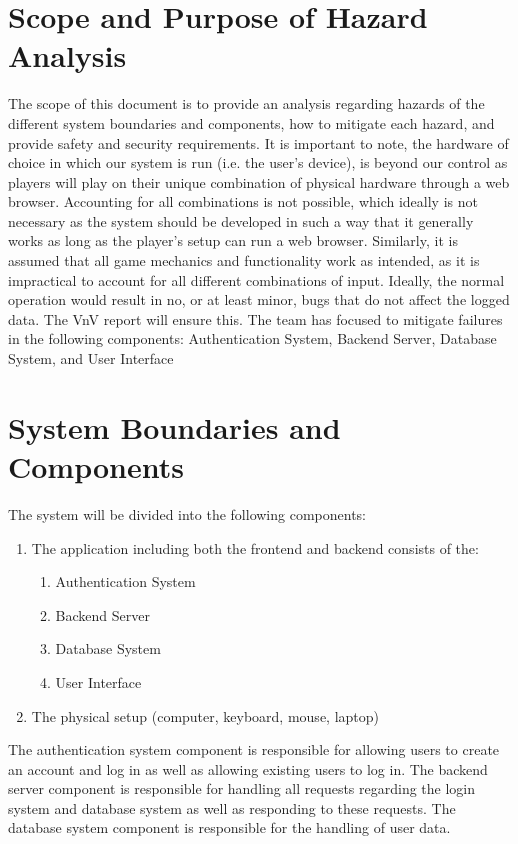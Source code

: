 \documentclass{article}
\begin{document}
\section{Scope and Purpose of Hazard Analysis}
The scope of this document is to provide an analysis regarding hazards of the different system boundaries and components, how to mitigate each hazard, and provide safety and security requirements. It is important to note, the hardware of choice in which our system is run (i.e. the user's device), is beyond our control as players will play on their unique combination of physical hardware through a web browser. Accounting for all combinations is not possible, which ideally is not necessary as the system should be developed in such a way that it generally works as long as the player's setup can run a web browser. Similarly, it is assumed that all game mechanics and functionality work as intended, as it is impractical to account for all different combinations of input. Ideally, the normal operation would result in no, or at least minor, bugs that do not affect the logged data. The VnV report will ensure this. The team has focused to mitigate failures in the following components: Authentication System, Backend Server, Database System, and User Interface

\section{System Boundaries and Components}
The system will be divided into the following components:

\begin{enumerate}
    \item The application including both the frontend and backend consists of the:
    \begin{enumerate}
        \item Authentication System
        \item Backend Server
        \item Database System
        \item User Interface
    \end{enumerate}
    \item The physical setup (computer, keyboard, mouse, laptop)
\end{enumerate}

The authentication system component is responsible for allowing users to create an account and log in as well as allowing existing users to log in. The backend server component is responsible for handling all requests regarding the login system and database system as well as responding to these requests. The database system component is responsible for the handling of user data.
\end{document}

